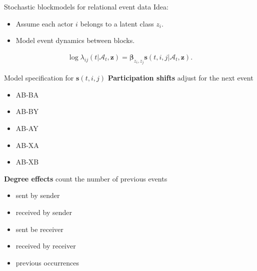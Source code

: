 \documentclass{beamer}
\begin{document}
\begin{frame}{Stochastic blockmodels for relational event data}
Idea: 
  \begin{itemize}
  \item Assume each actor $i$ belongs to a latent class $z_i$.
  \item Model event dynamics between blocks.
  \end{itemize}

\begin{align}
\log \lambda_{ij}(t | \mathcal{A}_t,\mathbf{z}) = \boldsymbol{\beta}_{z_i,z_j} \mathbf{s}(t,i,j|\mathcal{A}_t,\mathbf{z}).
\end{align}



\end{frame}

\begin{frame}{Model specification for $\mathbf{s}(t,i,j)$}
\textbf{Participation shifts} adjust for the next event
\begin{itemize}
\item AB-BA
\item AB-BY
\item AB-AY
\item AB-XA
\item AB-XB
\end{itemize}

\textbf{Degree effects} count the number of previous events
\begin{itemize}
\item sent by sender
\item received by sender
\item sent be receiver
\item received by receiver
\item previous occurrences
\end{itemize}

\end{frame}
\end{document}
